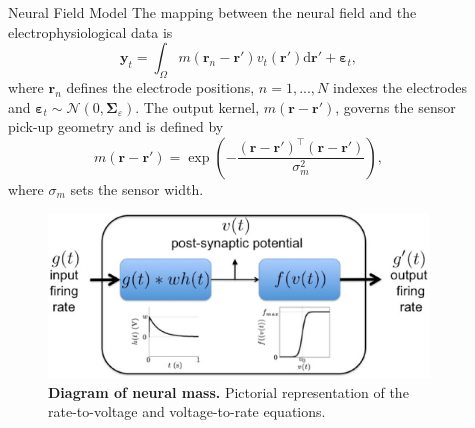 \documentclass[final]{beamer}
\newlength{\sepwid}
\newlength{\onecolwid}
\begin{document}
\begin{frame}[t]
\begin{columns}[t]
\begin{column}{\onecolwid}
\begin{block}{Neural Field Model}
{The mapping between the neural field and the electrophysiological data is
	\begin{equation}
	    \label{eq:ObservationEquation}
		\mathbf{y}_t =
		\int_{\Omega}{
		    m\left(\mathbf{r}_n-\mathbf{r}'\right)v_t\left(\mathbf{r}'\right)
		\textrm{d}\mathbf{r}'} + 
		\boldsymbol{\varepsilon}_t, 
	\end{equation}
	where $\mathbf{r}_n$ defines the electrode positions, $n=1,...,N$ indexes the electrodes and $\boldsymbol{\varepsilon}_t \sim \mathcal{N}\left(0,\boldsymbol{\Sigma}_{\varepsilon}\right)$. The output kernel, $m(\mathbf{r}-\mathbf{r}')$, governs the sensor pick-up geometry and is defined by 
	\begin{equation}
		m\left(\mathbf{r}-\mathbf{r}'\right) = \exp{\left(-\frac{(\mathbf{r}-\mathbf{r}')^\top(\mathbf{r}-\mathbf{r}')}{\sigma_m^2}\right)},
	\end{equation}
	where $\sigma_m$ sets the sensor width.}
    \end{block}

	\begin{figure}
	\begin{center}
	\includegraphics[width=10in, scale = 10]{FieldModel.eps}
	\end{center}
	\caption{{\bf Diagram of neural mass.} Pictorial representation of the rate-to-voltage and voltage-to-rate equations.} 
	\label{fig:Figure1}
	\end{figure}
	
    \end{column}

    \begin{column}{\sepwid}\end{column}			%
	
    \begin{column}{\onecolwid}					  
      



\end{column}
\end{columns}
\end{frame}
\end{document}
